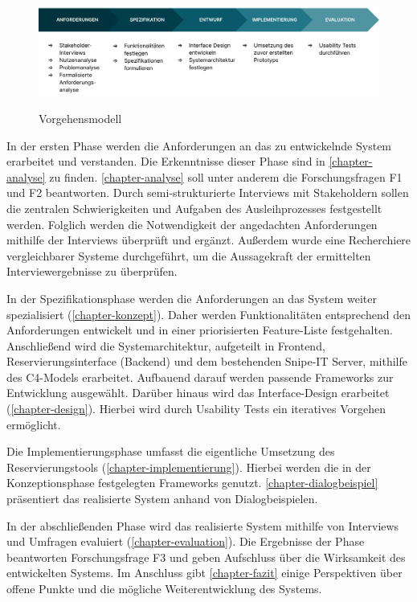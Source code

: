 \begin{figure}[h]
  \centering
  \includegraphics[scale=0.156]{Bilder/Screenshot 2022-10-17 at 18-39-40 Vorgehensmodell.pptx.png}
  \label{fig:vorgehen}
  \caption[Vorgehensmodell]{Vorgehensmodell}
\end{figure}

In der ersten Phase werden die Anforderungen an das zu entwickelnde System erarbeitet und
verstanden. Die Erkenntnisse dieser Phase sind in \ref{chapter-analyse} zu finden.
\ref{chapter-analyse} soll unter anderem die Forschungsfragen F1 und F2 beantworten. Durch
semi-strukturierte Interviews mit Stakeholdern sollen die zentralen Schwierigkeiten und Aufgaben des
Ausleihprozesses festgestellt werden. Folglich werden die Notwendigkeit der angedachten
Anforderungen mithilfe der Interviews überprüft und ergänzt. Außerdem wurde eine Recherchiere
vergleichbarer Systeme durchgeführt, um die Aussagekraft der ermittelten Interviewergebnisse zu
überprüfen.

In der Spezifikationsphase werden die Anforderungen an das System weiter spezialisiert
(\ref{chapter-konzept}). Daher werden Funktionalitäten entsprechend den Anforderungen entwickelt und
in einer priorisierten Feature-Liste festgehalten. Anschließend wird die Systemarchitektur,
aufgeteilt in Frontend, Reservierungsinterface (Backend) und dem bestehenden Snipe-IT Server,
mithilfe des C4-Models erarbeitet. Aufbauend darauf werden passende Frameworks zur Entwicklung
ausgewählt. Darüber hinaus wird das Interface-Design erarbeitet (\ref{chapter-design}). Hierbei wird
durch Usability Tests ein iteratives Vorgehen ermöglicht.
 

Die Implementierungsphase umfasst die eigentliche Umsetzung des Reservierungstools
(\ref{chapter-implementierung}). Hierbei werden die in der Konzeptionsphase festgelegten Frameworks
genutzt. \ref{chapter-dialogbeispiel} präsentiert das realisierte System anhand von
Dialogbeispielen.

In der abschließenden Phase wird das realisierte System mithilfe von Interviews und Umfragen
evaluiert (\ref{chapter-evaluation}). Die Ergebnisse der Phase beantworten Forschungsfrage F3 und
geben Aufschluss über die Wirksamkeit des entwickelten Systems. Im Anschluss gibt
\ref{chapter-fazit} einige Perspektiven über offene Punkte und die mögliche Weiterentwicklung des
Systems.